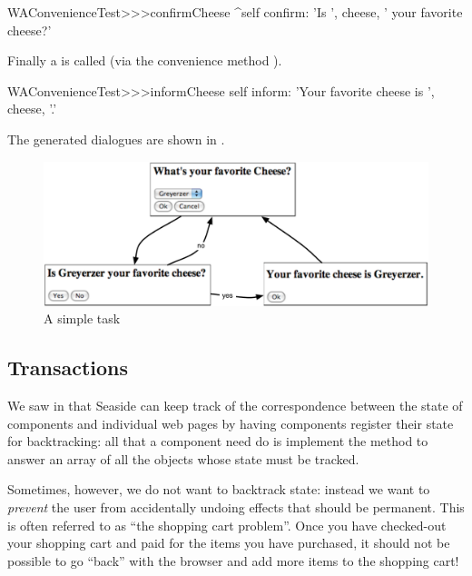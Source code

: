 \documentclass[a4paper,10pt,twoside]{book}
\begin{document}
{{\begin{code}{}
WAConvenienceTest>>>confirmCheese
	^self confirm: 'Is ', cheese,  ' your favorite cheese?'
\end{code}

Finally a  is called (via the convenience method ).

\begin{code}{}
WAConvenienceTest>>>informCheese
	self inform: 'Your favorite cheese is ', cheese, '.'
\end{code}

The generated dialogues are shown in .

\begin{figure}[ht]
\begin{center}
\includegraphics[width=\textwidth]{chooseCheese}
\caption{A simple task}
\end{center}
\end{figure}

\subsection{Transactions}

We saw in  that Seaside can keep track of the correspondence between the state of components and individual web pages by having components register their state for backtracking:
all that a component need do is implement the method  to answer an array of all the objects whose state must be tracked.

Sometimes, however, we do not want to backtrack state: instead we want to \emph{prevent} the user from accidentally undoing effects that should be permanent.
This is often referred to as ``the shopping cart problem''.
Once you have checked-out your shopping cart and paid for the items you have purchased, it should not be possible to go ``back'' with the browser and add more items to the shopping cart!

}}
\end{document}
